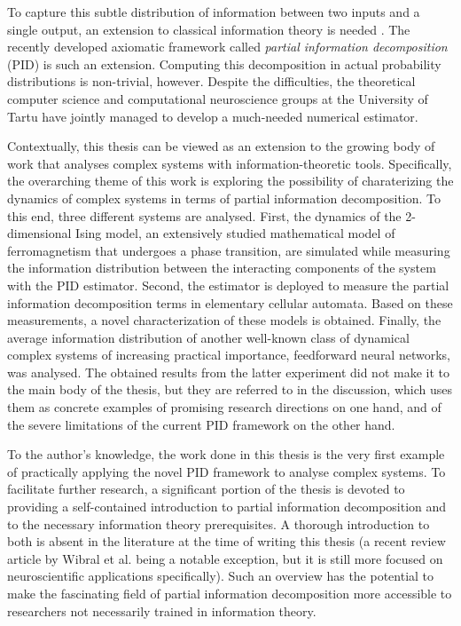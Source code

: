 \documentclass[12pt]{article}
\begin{document}
To capture this subtle distribution of information between two inputs and a single output, an extension to classical information theory is needed \cite{williams-beer}. The recently developed axiomatic framework called \textit{partial information decomposition} (PID) \cite{bertschinger} is such an extension. Computing this decomposition in actual probability distributions is non-trivial, however. Despite the difficulties, the theoretical computer science and computational neuroscience groups at the University of Tartu have jointly managed to develop a much-needed numerical estimator. 

Contextually, this thesis can be viewed as an extension to the growing body of work that analyses complex systems with information-theoretic tools. Specifically, the overarching theme of this work is exploring the possibility of charaterizing the dynamics of complex systems in terms of partial information decomposition. To this end, three different systems are analysed. First, the dynamics of the 2-dimensional Ising model, an extensively studied mathematical model of ferromagnetism that undergoes a phase transition, are simulated while measuring the information distribution between the interacting components of the system with the PID estimator. Second, the estimator is deployed to measure the partial information decomposition terms in elementary cellular automata. Based on these measurements, a novel characterization of these models is obtained. Finally, the average information distribution of another well-known class of dynamical complex systems of increasing practical importance, feedforward neural networks, was analysed. The obtained results from the latter experiment did not make it to the main body of the thesis, but they are referred to in the discussion, which uses them as concrete examples of promising research directions on one hand, and of the severe limitations of the current PID framework on the other hand. 

To the author's knowledge, the work done in this thesis is the very first example of practically applying the novel PID framework to analyse complex systems. To facilitate further research, a significant portion of the thesis is devoted to providing a self-contained introduction to partial information decomposition and to the necessary information theory prerequisites. A thorough introduction to both is absent in the literature at the time of writing this thesis (a recent review article by Wibral et al.  \cite{bits-from-brains} being a notable exception, but it is still more focused on neuroscientific applications specifically). Such an overview has the potential to make the fascinating field of partial information decomposition more accessible to researchers not necessarily trained in information theory.  
\end{document}
